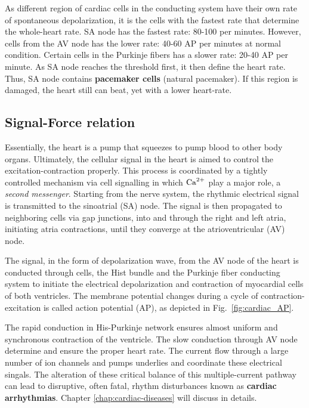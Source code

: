 As different region of cardiac cells in the conducting system have their own
rate of spontaneous depolarization, it is the cells with the fastest rate that
determine the whole-heart rate. SA node has the fastest rate: 80-100 per
minutes. However, cells from the AV node has the lower rate: 40-60 AP per
minutes at normal condition. Certain cells in the Purkinje fibers has a slower
rate: 20-40 AP per minute. As SA node reaches the threshold first, it then
define the heart rate. Thus, SA node contains {\bf pacemaker cells} (natural
pacemaker). If this region is damaged, the heart still can beat, yet with a
lower heart-rate.




\subsection{Signal-Force relation}
\label{sec:sign-force-relat}

Essentially, the heart is a pump that squeezes to pump blood to other body
organs. Ultimately, the cellular signal in the heart is aimed to control the
excitation-contraction properly. This process is coordinated by a tightly
controlled mechanism via cell signalling in which ${\text{Ca}^{2+}}$ play a major role, a
{\it second messenger}. Starting from the nerve system, the rhythmic electrical
signal is transmitted to the sinoatrial (SA) node. The signal is then 
propagated to neighboring cells via gap junctions, into and through the right
and left atria,  initiating atria contractions, until they converge at the
atrioventricular (AV) node.

The signal, in the form of depolarization wave, from the AV node of the heart is
conducted through cells, the Hist bundle and the Purkinje fiber conducting
system to initiate the electrical depolarization and contraction of myocardial cells of
both ventricles. The membrane potential changes during a cycle of 
contraction-excitation is called action potential (AP), as depicted in 
Fig.~\ref{fig:cardiac_AP}. 

\begin{framed}
The rapid conduction in His-Purkinje network ensures almost uniform
and synchronous contraction of the ventricle. The slow conduction through AV
node determine and ensure the proper heart rate. The current flow through a
large number of ion channels and pumps underlies and coordinate these electrical
singals. The alteration of these critical balance of this multiple-current
pathway can lead to disruptive, often fatal, rhythm disturbances known as {\bf
cardiac arrhythmias}. Chapter \ref{chap:cardiac-diseases} will discuss in details. 
\end{framed}

